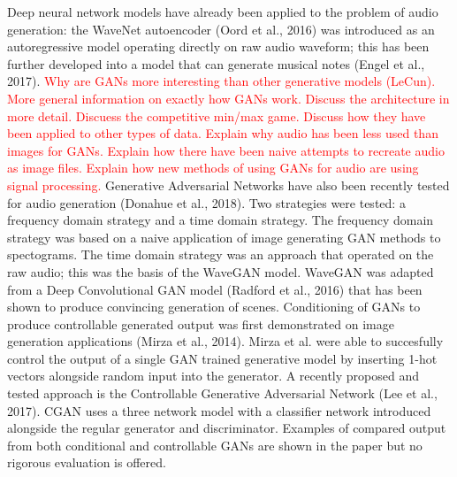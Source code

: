 \documentclass[titlepage]{article}
\begin{document}
Deep neural network models have already been applied to the problem of audio generation: the WaveNet autoencoder (Oord et al., 2016) was introduced as an autoregressive model operating directly on raw audio waveform; this has been further developed into a model that can generate musical notes (Engel et al., 2017).
\newline
\newline
\textcolor{red}{
  Why are GANs more interesting than other generative models (LeCun).
  More general information on exactly how GANs work.
  Discuss the architecture in more detail.
  Discuess the competitive min/max game.
  Discuss how they have been applied to other types of data.
}
\newline
\newline
\textcolor{red}{
  Explain why audio has been less used than images for GANs.
  Explain how there have been naive attempts to recreate audio as image files.
  Explain how new methods of using GANs for audio are using signal processing.
}
\newline
\newline
Generative Adversarial Networks have also been recently tested for audio generation (Donahue et al., 2018).
Two strategies were tested: a frequency domain strategy and a time domain strategy.
The frequency domain strategy was based on a naive application of image generating GAN methods to spectograms.
The time domain strategy was an approach that operated on the raw audio; this was the basis of the WaveGAN model.
WaveGAN was adapted from a Deep Convolutional GAN model (Radford et al., 2016) that has been shown to produce convincing generation of scenes.
\newline
\newline
Conditioning of GANs to produce controllable generated output was first demonstrated on image generation applications (Mirza et al., 2014).
Mirza et al. were able to succesfully control the output of a single GAN trained generative model by inserting 1-hot vectors alongside random input into the generator.
\newline
\newline
A recently proposed and tested approach is the Controllable Generative Adversarial Network (Lee et al., 2017).
CGAN uses a three network model with a classifier network introduced alongside the regular generator and discriminator.
Examples of compared output from both conditional and controllable GANs are shown in the paper but no rigorous evaluation is offered.
\newline
\end{document}
